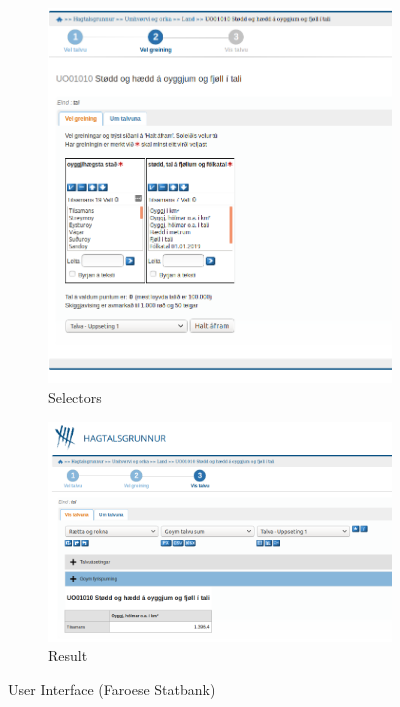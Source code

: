 \begin{figure}[H]
\begin{subfigure}[b]{0.3\linewidth}
  \end{subfigure}  
  \begin{subfigure}[b]{0.3\linewidth}
    \includegraphics[width=\linewidth]{img/ui2.png}
    \caption{Selectors}
    \label{fig:selectors}
    
  \end{subfigure}  
  \begin{subfigure}[b]{0.3\linewidth}
    \includegraphics[width=\linewidth]{img/ui3.png}
    \caption{Result}
    \label{fig:result}
    
  \end{subfigure}  
  \caption{User Interface (Faroese Statbank)}
  \label{fig:uifaroesestatsbank}
\end{figure}

